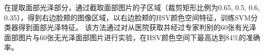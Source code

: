在提取面部光泽部分，通过截取面部图片的子区域（裁剪矩形比例为{0.65, 0.5, 0.6, 0.35}），得到右边脸颊的图像区域，以右边脸颊的HSV颜色空间特征，训练SVM分类器得到面部光泽特征。
该方法通过对从医院获取并经过专家判别的60张有光泽面部图片与60张无光泽面部图片进行实验，在HSV颜色空间下最高达到84\%的准确率。
%
%
%
%
%
%
%
%
%
%
